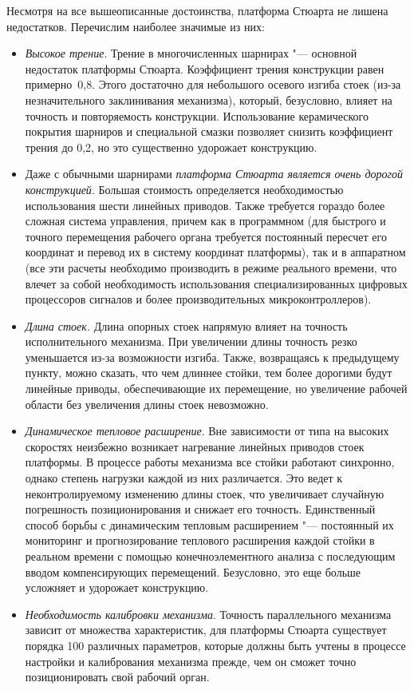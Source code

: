 Несмотря на все вышеописанные достоинства, платформа Стюарта не лишена недостатков. Перечислим наиболее значимые из них:
\begin{itemize}
	\item \textit{Высокое трение}. Трение в многочисленных шарнирах "--- основной недостаток платформы Стюарта. Коэффициент трения конструкции равен примерно~0,8. Этого достаточно для небольшого осевого изгиба стоек (из-за незначительного заклинивания механизма), который, безусловно, влияет на точность и повторяемость конструкции. Использование керамического покрытия шарниров и специальной смазки позволяет снизить коэффициент трения до 0,2, но это существенно удорожает конструкцию.
	
	\item Даже с обычными шарнирами \textit{платформа Стюарта является очень дорогой конструкцией}. Большая стоимость определяется необходимостью использования шести линейных приводов. Также требуется гораздо более сложная система управления, причем как в программном (для быстрого и точного перемещения рабочего органа требуется постоянный пересчет его координат и перевод их в систему координат платформы), так и в аппаратном (все эти расчеты необходимо производить в режиме реального времени, что влечет за собой необходимость использования специализированных цифровых процессоров сигналов и более производительных микроконтроллеров). 
	
	\item \textit{Длина стоек.} Длина опорных стоек напрямую влияет на точность исполнительного механизма. При увеличении длины точность резко уменьшается из-за возможности изгиба. Также, возвращаясь к предыдущему пункту, можно сказать, что чем длиннее стойки, тем более дорогими будут линейные приводы, обеспечивающие их перемещение, но увеличение рабочей области без увеличения длины стоек невозможно.
	
	\item \textit{Динамическое тепловое расширение}. Вне зависимости от типа на высоких скоростях неизбежно возникает нагревание линейных приводов стоек платформы. В процессе работы механизма все стойки работают синхронно, однако степень нагрузки каждой из них различается. Это ведет к неконтролируемому изменению длины стоек, что увеличивает случайную погрешность позиционирования и снижает его точность. Единственный способ борьбы с динамическим тепловым расширением "--- постоянный их мониторинг и прогнозирование теплового расширения каждой стойки в реальном времени с помощью конечноэлементного анализа с последующим вводом компенсирующих перемещений. Безусловно, это еще больше усложняет и удорожает конструкцию.
	
	\item \textit{Необходимость калибровки механизма}. Точность параллельного механизма зависит от множества характеристик, для платформы Стюарта существует порядка 100 различных параметров, которые должны быть учтены в процессе настройки и калибрования механизма прежде, чем он сможет точно позиционировать свой рабочий орган.
	
	
\end{itemize}

